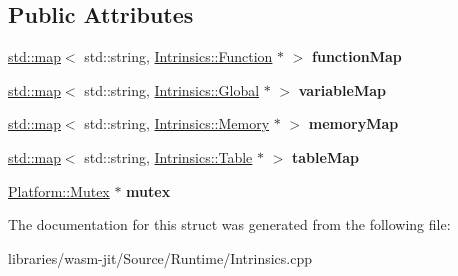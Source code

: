 \subsection*{Public Attributes}
\begin{DoxyCompactItemize}
\item 
\mbox{\label{struct_intrinsics_1_1_singleton_a39ea76e76006654966f34fba12e7c5ab}} 
\mbox{\hyperlink{classstd_1_1map}{std\+::map}}$<$ std\+::string, \mbox{\hyperlink{struct_intrinsics_1_1_function}{Intrinsics\+::\+Function}} $\ast$ $>$ {\bfseries function\+Map}
\item 
\mbox{\label{struct_intrinsics_1_1_singleton_acbe7fb9bc2d3480ef5bcedb3c8ffb89d}} 
\mbox{\hyperlink{classstd_1_1map}{std\+::map}}$<$ std\+::string, \mbox{\hyperlink{struct_intrinsics_1_1_global}{Intrinsics\+::\+Global}} $\ast$ $>$ {\bfseries variable\+Map}
\item 
\mbox{\label{struct_intrinsics_1_1_singleton_af728fb4c895423f91567fa346cd9aec5}} 
\mbox{\hyperlink{classstd_1_1map}{std\+::map}}$<$ std\+::string, \mbox{\hyperlink{struct_intrinsics_1_1_memory}{Intrinsics\+::\+Memory}} $\ast$ $>$ {\bfseries memory\+Map}
\item 
\mbox{\label{struct_intrinsics_1_1_singleton_aac2d12bac70c89a66e8e67b0ed8c11b6}} 
\mbox{\hyperlink{classstd_1_1map}{std\+::map}}$<$ std\+::string, \mbox{\hyperlink{struct_intrinsics_1_1_table}{Intrinsics\+::\+Table}} $\ast$ $>$ {\bfseries table\+Map}
\item 
\mbox{\label{struct_intrinsics_1_1_singleton_a7ceda158e6ddc8fcbef6d8c7b08c6b20}} 
\mbox{\hyperlink{struct_platform_1_1_mutex}{Platform\+::\+Mutex}} $\ast$ {\bfseries mutex}
\end{DoxyCompactItemize}


The documentation for this struct was generated from the following file\+:\begin{DoxyCompactItemize}
\item 
libraries/wasm-\/jit/\+Source/\+Runtime/Intrinsics.\+cpp\end{DoxyCompactItemize}
